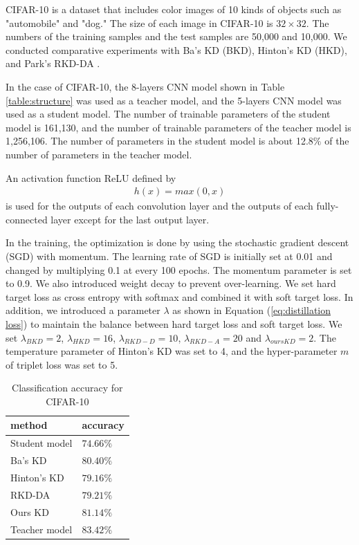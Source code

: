 \documentclass[conference]{IEEEtran}
\begin{document}
CIFAR-10 is a dataset that includes color images of 10 kinds of objects such as "automobile" and "dog."
The size of each image in CIFAR-10 is $32 \times 32$.
The numbers of the training samples and the test samples are 50,000 and 10,000.
We conducted comparative experiments with Ba's KD \cite{Ba2014} (BKD), Hinton's KD \cite{Hinton2015} (HKD), and Park's RKD-DA \cite{Park2019}.

In the case of CIFAR-10, the 8-layers CNN model shown in Table \ref{table:structure} was used as a teacher model, and the 5-layers CNN model was used as a student model.
The number of trainable parameters of the student model is 161,130, and the number of trainable parameters of the teacher model is 1,256,106. 
The number of parameters in the student model is about 12.8$\%$ of the number of parameters in the teacher model.

An activation function ReLU defined by
\begin{align} \label{eq:ReLU}
h(x) = max(0,x)
\end{align}
is used for the outputs of each convolution layer and the outputs of each fully-connected layer except for the last output layer.

In the training, the optimization is done by using the stochastic gradient descent (SGD) with momentum.
The learning rate of SGD is initially set at 0.01 and changed by multiplying 0.1 at every 100 epochs. 
The momentum parameter is set to 0.9.
We also introduced weight decay to prevent over-learning.
We set hard target loss as cross entropy with softmax and combined it with soft target loss.
In addition, we introduced a parameter $\lambda$ as shown in Equation (\ref{eq:distillation loss}) to maintain the balance between hard target loss and soft target loss.
We set $\lambda_{BKD}=2$, $\lambda_{HKD}=16$, $\lambda_{RKD-D}=10$, $\lambda_{RKD-A}=20$ and $\lambda_{oursKD}=2$.
The temperature parameter of Hinton's KD \cite{Hinton2015} was set to 4, and the hyper-parameter $m$ of triplet loss was set to 5.


\begin{table}[ht]
\caption{Classification accuracy for CIFAR-10}
\label{table:cifar-10}
\begin{center}
\begin{tabular}{|l|l|}
\hline
method & accuracy \\ \hline \hline
Student model & $74.66\%$ \\ \hline
Ba's KD & $80.40\%$ \\ \hline
Hinton's KD & $79.16\%$ \\ \hline
RKD-DA &       $79.21\%$     \\ \hline
Ours KD & $\bm{81.14}\%$ \\ \hline \hline
Teacher model  & $83.42\%$     \\
\hline
\end{tabular}
\end{center}
\end{table}
\end{document}
